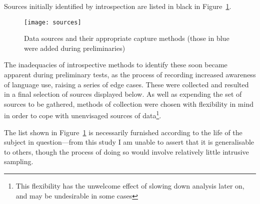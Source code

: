 Sources initially identified by introspection are listed in black in Figure~\ref{fig:personal:datasources}.

\begin{figure}[p]
\centering
\texttt{[image: sources]}
\caption{Data sources and their appropriate capture methods (those in blue were added during preliminaries)}
\label{fig:personal:datasources}
\end{figure}



The inadequacies of introspective methods to identify these soon became apparent during preliminary tests, as the process of recording increased awareness of language use, raising a series of edge cases.  These were collected and resulted in a final selection of sources displayed below.  As well as expending the set of sources to be gathered, methods of collection were chosen with flexibility in mind in order to cope with unenvisaged sources of data\footnote{This flexibility has the unwelcome effect of slowing down analysis later on, and may be undesirable in some cases}.



The list shown in Figure~\ref{fig:personal:datasources} is necessarily furnished according to the life of the subject in question---from this study I am unable to assert that it is generalisable to others, though the process of doing so would involve relatively little intrusive sampling.

